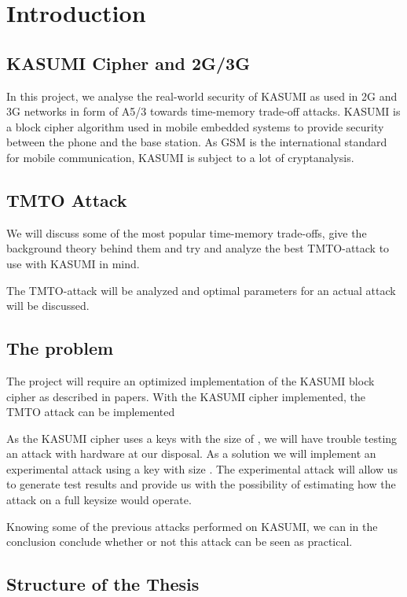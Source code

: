 \chapter{Introduction}

\section{KASUMI Cipher and 2G/3G}

In this project, we analyse the real-world security of KASUMI as used
in 2G and 3G networks in form of A5/3 towards time-memory trade-off
attacks. KASUMI is a block cipher algorithm used in mobile embedded
systems to provide security between the phone and the base station. As
GSM is the international standard for mobile communication, KASUMI
is subject to a lot of cryptanalysis.

\section{TMTO Attack}

We will discuss some of the most popular time-memory trade-offs, give
the background theory behind them and try and analyze the best
TMTO-attack to use with KASUMI in mind.

The  TMTO-attack will be analyzed and optimal parameters for an
actual attack will be discussed.


\section{The problem}

The project will require an optimized implementation of the KASUMI
block cipher as described in papers. With the KASUMI cipher
implemented, the TMTO attack can be implemented

As the KASUMI cipher uses a keys with the size of , we
will have trouble testing an attack with hardware at our disposal. As
a solution we will implement an experimental attack using a key with
size . The experimental attack will allow us to generate
test results and provide us with the possibility of estimating how the
attack on a full keysize would operate.

Knowing some of the previous attacks performed on KASUMI, we can in
the conclusion conclude whether or not this attack can be seen as practical.

\section{Structure of the Thesis}

